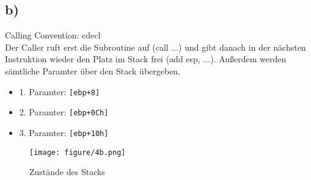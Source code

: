 \documentclass[]{scrreprt}
\begin{document}
	\subsection*{b)}
	Calling Convention: cdecl\\
	Der Caller ruft erst die Subroutine auf (call $\dots$) und gibt danach in der nächsten Instruktion wieder den Platz im Stack frei (add esp, $\dots$). Außerdem werden sämtliche Paramter über den Stack übergeben.
	\begin{itemize}
		\item 1. Paramter: \texttt{[ebp+8]}
		\item 2. Paramter: \texttt{[ebp+0Ch]}
		\item 3. Paramter: \texttt{[ebp+10h]}
	\end{itemize}
\begin{figure}[h]
	\centering
	\texttt{[image: figure/4b.png]}
	\caption{Zustände des Stacks}
\end{figure}
\end{document}
